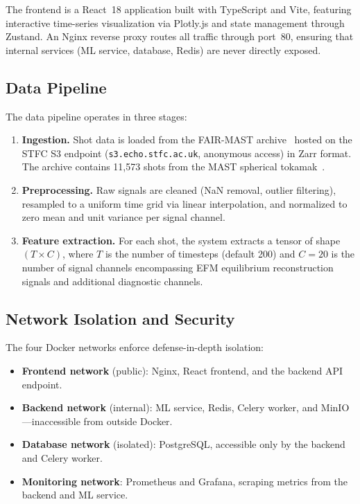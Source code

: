 \documentclass[twocolumn]{article}
\begin{document}
The frontend is a React~18 application built with TypeScript
and Vite, featuring interactive time-series visualization via
Plotly.js and state management through Zustand.
An Nginx reverse proxy routes all traffic through port~80,
ensuring that internal services (ML service, database, Redis)
are never directly exposed.

\subsection{Data Pipeline}

The data pipeline operates in three stages:
\begin{enumerate}[noitemsep]
  \item \textbf{Ingestion.} Shot data is loaded from the
    FAIR-MAST archive~\citep{fairmast} hosted on the STFC S3
    endpoint (\texttt{s3.echo.stfc.ac.uk}, anonymous access)
    in Zarr format. The archive contains 11{,}573 shots from
    the MAST spherical tokamak~\citep{sykes2001}.
  \item \textbf{Preprocessing.} Raw signals are cleaned
    (NaN removal, outlier filtering), resampled to a uniform
    time grid via linear interpolation, and normalized to
    zero mean and unit variance per signal channel.
  \item \textbf{Feature extraction.} For each shot, the system
    extracts a tensor of shape
    $(T \times C)$, where $T$ is the number of timesteps
    (default 200) and $C = 20$ is the number of signal channels
    encompassing EFM equilibrium reconstruction signals and
    additional diagnostic channels.
\end{enumerate}

\subsection{Network Isolation and Security}

The four Docker networks enforce defense-in-depth isolation:
\begin{itemize}[noitemsep]
  \item \textbf{Frontend network} (public): Nginx, React frontend,
    and the backend API endpoint.
  \item \textbf{Backend network} (internal): ML service, Redis,
    Celery worker, and MinIO---inaccessible from outside Docker.
  \item \textbf{Database network} (isolated): PostgreSQL, accessible
    only by the backend and Celery worker.
  \item \textbf{Monitoring network}: Prometheus and Grafana,
    scraping metrics from the backend and ML service.
\end{itemize}
\end{document}
